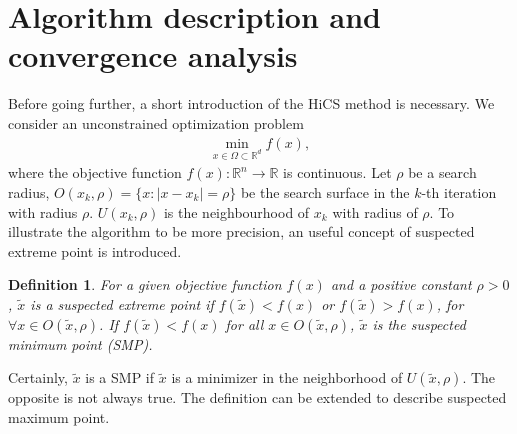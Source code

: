 \documentclass[final,1p,times]{elsarticle}
\newtheorem{definition}{Definition}
\newtheorem{proposition}{Proposition}
\def\bbR{\mathbb{R}}
\begin{document}
\section{Algorithm description and convergence analysis}
\label{sec:algorithm}

Before going further, a short introduction of the
HiCS method is necessary.
We consider an unconstrained optimization problem 
\begin{align}
	\min_{x\in\Omega\subset\mathbb{R}^d} f(x),
	\label{}
\end{align}
where the objective function $f(x):\bbR^n\rightarrow \bbR$ is
continuous. Let $\rho$ be a search radius, $O(x_k, \rho)=\{x:
|x-x_k|=\rho\}$ be the search surface in the
$k$-th iteration with radius $\rho$. $U(x_k,
\rho)$ is the neighbourhood of $x_k$ with radius of $\rho$.
To illustrate the algorithm to be more precision, an useful concept of
suspected extreme point is introduced.
\begin{definition}	
	For a given objective function $f(x)$ and a positive constant 
	$\rho>0$, $\tilde{x}$ is a suspected extreme point if $f(\tilde
	x)<f(x)$ or $f(\tilde x)>f(x)$, for $\forall x\in O(\tilde{x},\rho)$.
	If $f(\tilde x) < f(x)$ for all $x\in O(\tilde{x},\rho)$,
	$\tilde{x}$ is the suspected minimum point (SMP).
\end{definition}
Certainly, $\tilde{x}$ is a SMP if $\tilde{x}$ is a minimizer in
the neighborhood of $U(\tilde{x}, \rho)$. The opposite is not always true.
The definition can be extended to describe suspected maximum point.
\end{document}
